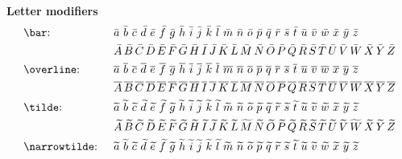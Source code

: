 \documentclass[parskip]{myarticle}
\begin{document}
\textbf{Letter modifiers}
\begin{align*}
    &\text{\texttt{\textbackslash bar}: } &&\bar{a}\,\,\bar{b}\,\,\bar{c}\,\,\bar{d}\,\,\bar{e}\,\,\bar{f}\,\,\bar{g}\,\,\bar{h}\,\,\bar{i}\,\,\bar{j}\,\,\bar{k}\,\,\bar{l}\,\,\bar{m}\,\,\bar{n}\,\,\bar{o}\,\,\bar{p}\,\,\bar{q}\,\,\bar{r}\,\,\bar{s}\,\,\bar{t}\,\,\bar{u}\,\,\bar{v}\,\,\bar{w}\,\,\bar{x}\,\,\bar{y}\,\,\bar{z} \\
    &&&\bar{A}\,\bar{B}\,\bar{C}\,\bar{D}\,\bar{E}\,\bar{F}\,\bar{G}\,\bar{H}\,\bar{I}\,\bar{J}\,\bar{K}\,\bar{L}\,\bar{M}\,\bar{N}\,\bar{O}\,\bar{P}\,\bar{Q}\,\bar{R}\,\bar{S}\,\bar{T}\,\bar{U}\,\bar{V}\,\bar{W}\,\bar{X}\,\bar{Y}\,\bar{Z} \\
    &\text{\texttt{\textbackslash overline}: } &&\overline{a}\,\,\overline{b}\,\,\overline{c}\,\,\overline{d}\,\,\overline{e}\,\,\overline{f}\,\,\overline{g}\,\,\overline{h}\,\,\overline{i}\,\,\overline{j}\,\,\overline{k}\,\,\overline{l}\,\,\overline{m}\,\,\overline{n}\,\,\overline{o}\,\,\overline{p}\,\,\overline{q}\,\,\overline{r}\,\,\overline{s}\,\,\overline{t}\,\,\overline{u}\,\,\overline{v}\,\,\overline{w}\,\,\overline{x}\,\,\overline{y}\,\,\overline{z} \\
    &&&\overline{A}\,\overline{B}\,\overline{C}\,\overline{D}\,\overline{E}\,\overline{F}\,\overline{G}\,\overline{H}\,\overline{I}\,\overline{J}\,\overline{K}\,\overline{L}\,\overline{M}\,\overline{N}\,\overline{O}\,\overline{P}\,\overline{Q}\,\overline{R}\,\overline{S}\,\overline{T}\,\overline{U}\,\overline{V}\,\overline{W}\,\overline{X}\,\overline{Y}\,\overline{Z} \\
    &\text{\texttt{\textbackslash tilde}: } &&\tilde{a}\,\,\tilde{b}\,\,\tilde{c}\,\,\tilde{d}\,\,\tilde{e}\,\,\tilde{f}\,\,\tilde{g}\,\,\tilde{h}\,\,\tilde{i}\,\,\tilde{j}\,\,\tilde{k}\,\,\tilde{l}\,\,\tilde{m}\,\,\tilde{n}\,\,\tilde{o}\,\,\tilde{p}\,\,\tilde{q}\,\,\tilde{r}\,\,\tilde{s}\,\,\tilde{t}\,\,\tilde{u}\,\,\tilde{v}\,\,\tilde{w}\,\,\tilde{x}\,\,\tilde{y}\,\,\tilde{z} \\
    &&&\tilde{A}\,\tilde{B}\,\tilde{C}\,\tilde{D}\,\tilde{E}\,\tilde{F}\,\tilde{G}\,\tilde{H}\,\tilde{I}\,\tilde{J}\,\tilde{K}\,\tilde{L}\,\tilde{M}\,\tilde{N}\,\tilde{O}\,\tilde{P}\,\tilde{Q}\,\tilde{R}\,\tilde{S}\,\tilde{T}\,\tilde{U}\,\tilde{V}\,\tilde{W}\,\tilde{X}\,\tilde{Y}\,\tilde{Z} \\
    &\text{\texttt{\textbackslash narrowtilde}: } &&\narrowtilde{a}\,\,\narrowtilde{b}\,\,\narrowtilde{c}\,\,\narrowtilde{d}\,\,\narrowtilde{e}\,\,\narrowtilde{f}\,\,\narrowtilde{g}\,\,\narrowtilde{h}\,\,\narrowtilde{i}\,\,\narrowtilde{j}\,\,\narrowtilde{k}\,\,\narrowtilde{l}\,\,\narrowtilde{m}\,\,\narrowtilde{n}\,\,\narrowtilde{o}\,\,\narrowtilde{p}\,\,\narrowtilde{q}\,\,\narrowtilde{r}\,\,\narrowtilde{s}\,\,\narrowtilde{t}\,\,\narrowtilde{u}\,\,\narrowtilde{v}\,\,\narrowtilde{w}\,\,\narrowtilde{x}\,\,\narrowtilde{y}\,\,\narrowtilde{z} \\

\end{align*}
\end{document}
